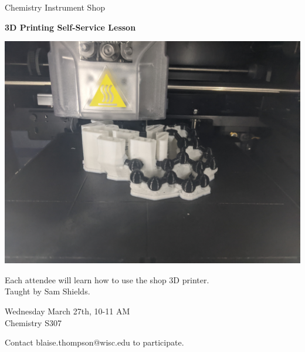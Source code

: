 \documentclass{article}
\begin{document}
\center

\Huge

Chemistry Instrument Shop

\textbf{
3D Printing
Self-Service Lesson
}

\includegraphics[width=\linewidth]{coverart.jpg}

{
\huge
Each attendee will learn how to use the shop 3D printer. \\
Taught by Sam Shields.
}

\vfill

{
\huge
Wednesday March 27th, 10-11 AM \\
Chemistry S307 \\
}

\vfill

{
\huge
Contact blaise.thompson@wisc.edu to participate.
}
\end{document}
